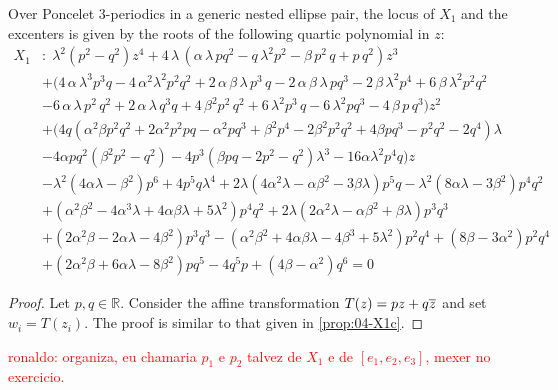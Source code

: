 \begin{proposition}
\label{prop:04-X1g}
Over Poncelet 3-periodics in a generic nested ellipse pair, the locus of $X_1$ and the excenters is given by the roots of the following quartic polynomial in $z$:
{\small
\begin{align*}
X_1&: \;{\lambda}^{2} \left( p^2-q^2 \right) {
z}^{4}+4\,\lambda\, \left( \alpha\,\lambda\,p q^2  - q\,{
\lambda}^{2}p^{2}-\beta\,p^2\,q+p\,q^{2} \right) {z}^{3}\\
&+  ( 4\,\alpha\,{
\lambda}^{3}p^{3} q-4\,{\alpha}^{2}{\lambda}^{2}p^{2}q^2 +2\,\alpha\,\beta\,\lambda\,p^{3}
\,q-2\,\alpha\,\beta\,\lambda\,pq^{3} -2\,\beta\,{\lambda}^{2
}p^{4}+6\,\beta\,{\lambda}^{2}p^{2}q^2\\
&-6\,\alpha\,
\lambda\,p^2\,q^{2}+2\,\alpha\,\lambda\,q^{3} q+4\,{
\beta}^{2}p^2\,q^{2}  
  +6\,{\lambda}^{2}p^{3} \,q
 -6\,{
\lambda}^{2} p q^{3}  -4\,\beta\,p\,q^{3}  ) {z}^{
2}\\
&+ ( 4 q (\alpha^2\beta p^2 q^2 + 2\alpha^2 p^2  p q - \alpha^2 p q^3 + \beta^2 p^4 - 2\beta^2 p^2 q^2+ 4\beta p q^3 - p^2 q^2 - 2 q^4)\lambda \\
&- 4\alpha  p q^2 (\beta^2 p^2 - q^2) - 4 p^3 (\beta p  q - 2 p^2 - q^2)\lambda^3 - 16\alpha\lambda^2 p^4   q ) z\\
   & -\lambda^2 (4 \alpha \lambda - \beta^2) p^6 + 4 p^5 q \lambda^4 + 2 \lambda (4 \alpha^2 \lambda - \alpha \beta^2 - 3 \beta \lambda) p^5 q   - \lambda^2 (8 \alpha \lambda - 3 \beta^2) p^4 q^2 \\
   &+ (\alpha^2 \beta^2 -4 \alpha^3 \lambda  + 4 \alpha \beta \lambda + 5 \lambda^2) p^4 q^2 + 2 \lambda (2 \alpha^2 \lambda - \alpha \beta^2 + \beta \lambda) p^3 q^3 \\
   &+ (2 \alpha^2 \beta - 2 \alpha \lambda - 4 \beta^2) p^3 q^3 - (\alpha^2 \beta^2 + 4 \alpha \beta \lambda - 4 \beta^3 + 5 \lambda^2) p^2 q^4 + ( 8 \beta-3 \alpha^2 ) p^2 q^4 \\
   &+ (2 \alpha^2 \beta + 6 \alpha \lambda - 8 \beta^2) p q^5 - 4 q^5 p + ( 4 \beta-\alpha^2 ) q^6=0
\end{align*}
}
\end{proposition}

\begin{proof} Let $p,q\in \mathbb{R}$. Consider the affine transformation
$T(z)=pz+q\overline z$ and set $w_i=T(z_i)$. The proof is similar to that given in \cref{prop:04-X1c}. 
\end{proof}

\textcolor{red}{ronaldo: organiza, eu chamaria $p_1$ e $p_2$ talvez de $X_1$ e de $[e_1,e_2,e_3]$, mexer no exercicio.}


